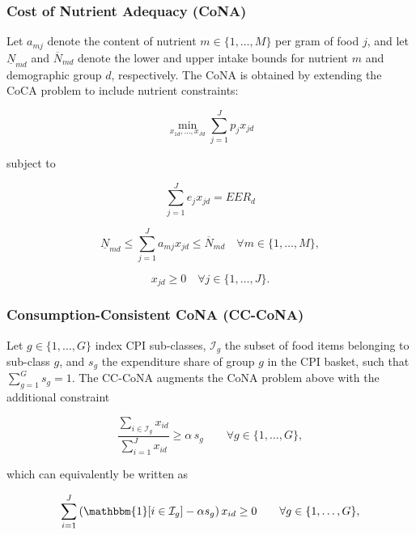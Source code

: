 \documentclass[Afour, sageh,times]{sagej}
\begin{document}
\subsubsection*{Cost of Nutrient Adequacy (CoNA)}
Let $a_{mj}$ denote the content of nutrient $m \in \{1, \ldots, M\}$ per gram of food $j$, and let $\underline{N}_{md}$ and $\overline{N}_{md}$ denote the lower and upper intake bounds for nutrient $m$ and demographic group $d$, respectively. The CoNA is obtained by extending the CoCA problem to include nutrient constraints:

\begin{equation}
\min_{x_{1d}, \ldots, x_{Jd}} \sum_{j=1}^{J} p_{j} x_{jd}
\end{equation}

subject to

\begin{equation}
    \sum_{j=1}^{J} e_{j}x_{jd} = EER_d
\end{equation}

\begin{equation}
    \underline{N}_{md} \leq \sum_{j=1}^{J} a_{mj} x_{jd} \leq \overline{N}_{md} \quad \forall m \in \{1, \ldots, M\},
\end{equation}

\begin{equation}
    x_{jd} \geq 0 \quad \forall j \in \{1, \ldots, J\}.
\end{equation}


\subsubsection*{Consumption-Consistent CoNA (CC-CoNA)}
Let $g \in \{1, \ldots, G\}$ index CPI sub-classes, $\mathcal{I}_g$ the subset of food items belonging to sub-class $g$, and $s_g$ the expenditure share of group $g$ in the CPI basket, such that $\sum_{g=1}^{G} s_g = 1$. The CC-CoNA augments the CoNA problem above with the additional constraint

\begin{equation}
    \frac{\sum_{i \in \mathcal{I}_g} x_{id}}{\sum_{i=1}^{J} x_{id}} \geq \alpha\, s_g \qquad \forall g \in \{1, \ldots, G\},
\end{equation}

which can equivalently be written as

\begin{equation}
    \sum_{i=1}^{J} \left(\mathbbm{1}[i \in \mathcal{I}_g] - \alpha s_g\right) x_{id} \geq 0 \qquad \forall g \in \{1, \ldots, G\},
\end{equation}
\end{document}
